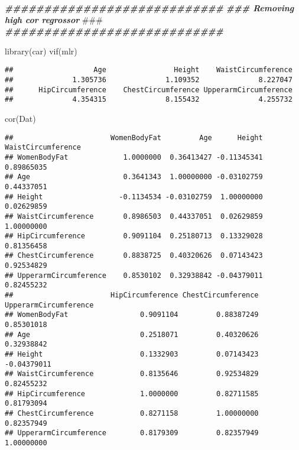 \documentclass[
]{article}
\newenvironment{Shaded}{\begin{snugshade}}{\end{snugshade}}
\newcommand{\AlertTok}[1]{\textcolor[rgb]{0.94,0.16,0.16}{#1}}
\newcommand{\DocumentationTok}[1]{\textcolor[rgb]{0.56,0.35,0.01}{\textbf{\textit{#1}}}}
\newcommand{\FunctionTok}[1]{\textcolor[rgb]{0.00,0.00,0.00}{#1}}
\newcommand{\NormalTok}[1]{#1}
\begin{document}
\begin{Shaded}
\begin{Highlighting}[]
\DocumentationTok{\#\#\#\#\#\#\#\#\#\#\#\#\#\#\#\#\#\#\#\#\#\#\#\#\#\#\#\#}
\DocumentationTok{\#\#\# Removing high cor regrossor }\AlertTok{\#\#\#}
\DocumentationTok{\#\#\#\#\#\#\#\#\#\#\#\#\#\#\#\#\#\#\#\#\#\#\#\#\#\#\#\#}

\FunctionTok{library}\NormalTok{(car)}
\FunctionTok{vif}\NormalTok{(mlr)}
\end{Highlighting}
\end{Shaded}

\begin{verbatim}
##                   Age                Height    WaistCircumference 
##              1.305736              1.109352              8.227047 
##      HipCircumference    ChestCircumference UpperarmCircumference 
##              4.354315              8.155432              4.255732
\end{verbatim}

\begin{Shaded}
\begin{Highlighting}[]
\FunctionTok{cor}\NormalTok{(Dat)}
\end{Highlighting}
\end{Shaded}

\begin{verbatim}
##                       WomenBodyFat         Age      Height WaistCircumference
## WomenBodyFat             1.0000000  0.36413427 -0.11345341         0.89865035
## Age                      0.3641343  1.00000000 -0.03102759         0.44337051
## Height                  -0.1134534 -0.03102759  1.00000000         0.02629859
## WaistCircumference       0.8986503  0.44337051  0.02629859         1.00000000
## HipCircumference         0.9091104  0.25180713  0.13329028         0.81356458
## ChestCircumference       0.8838725  0.40320626  0.07143423         0.92534829
## UpperarmCircumference    0.8530102  0.32938842 -0.04379011         0.82455232
##                       HipCircumference ChestCircumference UpperarmCircumference
## WomenBodyFat                 0.9091104         0.88387249            0.85301018
## Age                          0.2518071         0.40320626            0.32938842
## Height                       0.1332903         0.07143423           -0.04379011
## WaistCircumference           0.8135646         0.92534829            0.82455232
## HipCircumference             1.0000000         0.82711585            0.81793094
## ChestCircumference           0.8271158         1.00000000            0.82357949
## UpperarmCircumference        0.8179309         0.82357949            1.00000000
\end{verbatim}
\end{document}
